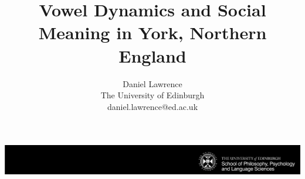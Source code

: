 \documentclass[a0,final]{a0poster}
\title{\Huge{Vowel Dynamics and Social Meaning in York, Northern England}}
\author{Daniel Lawrence\\The University of Edinburgh\\\hspace{0.5cm}daniel.lawrence@ed.ac.uk}
\begin{document}
\hspace{-4cm}								%
\vspace{-2cm}
\includegraphics{Black_Landscape.pdf}

\begin{minipage}{1191mm}					%
\vspace{-18cm}
\maketitle
\end{minipage}
\vspace{.5cm}
\end{document}
